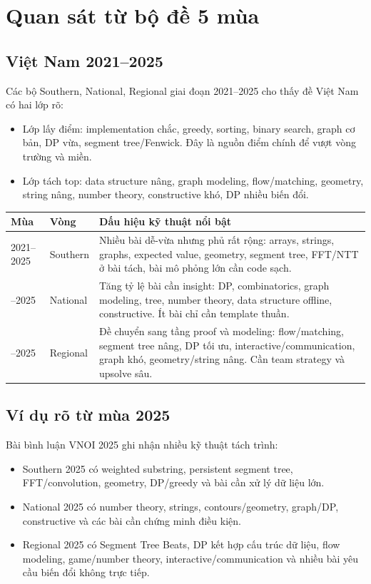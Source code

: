 \documentclass[11pt,a4paper]{article}
\begin{document}
\section{Quan sát từ bộ đề 5 mùa}

\subsection{Việt Nam 2021--2025}

Các bộ Southern, National, Regional giai đoạn 2021--2025 cho thấy đề Việt Nam có hai lớp rõ:

\begin{itemize}
  \item Lớp lấy điểm: implementation chắc, greedy, sorting, binary search, graph cơ bản, DP vừa, segment tree/Fenwick. Đây là nguồn điểm chính để vượt vòng trường và miền.
  \item Lớp tách top: data structure nâng, graph modeling, flow/matching, geometry, string nâng, number theory, constructive khó, DP nhiều biến đổi.
\end{itemize}

\begin{longtable}{p{2.1cm}p{2.4cm}p{9.5cm}}
\toprule
\textbf{Mùa} & \textbf{Vòng} & \textbf{Dấu hiệu kỹ thuật nổi bật}\\
\midrule
2021--2025 & Southern & Nhiều bài dễ-vừa nhưng phủ rất rộng: arrays, strings, graphs, expected value, geometry, segment tree, FFT/NTT ở bài tách, bài mô phỏng lớn cần code sạch.\\
\addlinespace
2021--2025 & National & Tăng tỷ lệ bài cần insight: DP, combinatorics, graph modeling, tree, number theory, data structure offline, constructive. Ít bài chỉ cần template thuần.\\
\addlinespace
2021--2025 & Regional & Đề chuyển sang tầng proof và modeling: flow/matching, segment tree nâng, DP tối ưu, interactive/communication, graph khó, geometry/string nâng. Cần team strategy và upsolve sâu.\\
\bottomrule
\end{longtable}

\subsection{Ví dụ rõ từ mùa 2025}

Bài bình luận VNOI 2025 ghi nhận nhiều kỹ thuật tách trình:

\begin{itemize}
  \item Southern 2025 có weighted substring, persistent segment tree, FFT/convolution, geometry, DP/greedy và bài cần xử lý dữ liệu lớn.
  \item National 2025 có number theory, strings, contours/geometry, graph/DP, constructive và các bài cần chứng minh điều kiện.
  \item Regional 2025 có Segment Tree Beats, DP kết hợp cấu trúc dữ liệu, flow modeling, game/number theory, interactive/communication và nhiều bài yêu cầu biến đổi không trực tiếp.
\end{itemize}
\end{document}
